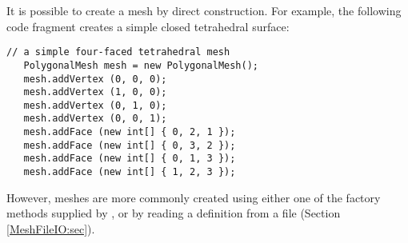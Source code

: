 It is possible to create a mesh by direct construction. For example,
the following code fragment creates a simple closed tetrahedral
surface:
%
\begin{lstlisting}[]
   // a simple four-faced tetrahedral mesh 
   PolygonalMesh mesh = new PolygonalMesh();
   mesh.addVertex (0, 0, 0);
   mesh.addVertex (1, 0, 0);
   mesh.addVertex (0, 1, 0);
   mesh.addVertex (0, 0, 1);
   mesh.addFace (new int[] { 0, 2, 1 });
   mesh.addFace (new int[] { 0, 3, 2 });
   mesh.addFace (new int[] { 0, 1, 3 });
   mesh.addFace (new int[] { 1, 2, 3 });      
\end{lstlisting}
%

However, meshes are more commonly created using either one of the
factory methods supplied by ,
or by reading a definition from a file (Section \ref{MeshFileIO:sec}).


